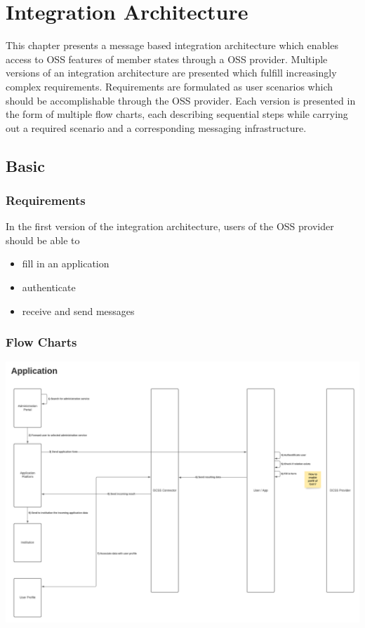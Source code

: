 \documentclass[
     12pt,         %
     a4paper,      %
     BCOR=10mm,version=first,     %
     DIV=14,version=first,        %
     ]{scrreprt}
\begin{document}
\chapter{Integration Architecture}

This chapter presents a message based integration architecture which enables access to OSS features of member states through a OSS provider. Multiple versions of an integration architecture are presented which fulfill increasingly complex requirements. Requirements are formulated as user scenarios which should be accomplishable through the OSS provider.
Each version is presented in the form of multiple flow charts, each describing sequential steps while carrying out a required scenario and a corresponding messaging infrastructure.

\section{Basic}

\subsection{Requirements}
In the first version of the integration architecture, users of the OSS provider should be able to
\begin{itemize}
    \item fill in an application
    \item authenticate
    \item receive and send messages
\end{itemize}

\subsection{Flow Charts}

\includegraphics[width=\textwidth]{Basic Integration Application.png}
\end{document}
